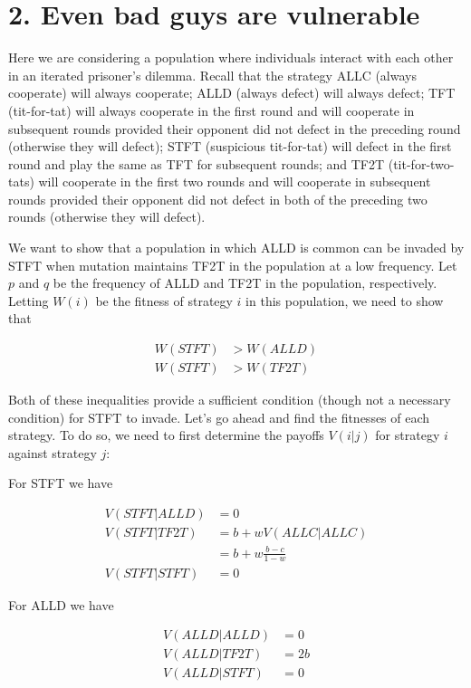 \documentclass{article}
\begin{document}
\section*{2. Even bad guys are vulnerable}

Here we are considering a population where individuals interact with
each other in an iterated prisoner's dilemma. Recall that the strategy
ALLC (always cooperate) will always cooperate; ALLD (always defect) will
always defect; TFT (tit-for-tat) will always cooperate in the first
round and will cooperate in subsequent rounds provided their opponent
did not defect in the preceding round (otherwise they will defect); STFT
(suspicious tit-for-tat) will defect in the first round and play the
same as TFT for subsequent rounds; and TF2T (tit-for-two-tats) will
cooperate in the first two rounds and will cooperate in subsequent
rounds provided their opponent did not defect in both of the preceding
two rounds (otherwise they will defect).

We want to show that a population in which ALLD is common can be invaded
by STFT when mutation maintains TF2T in the population at a low
frequency. Let $p$ and $q$ be the frequency of ALLD and TF2T in the
population, respectively. Letting $W(i)$ be the fitness of strategy $i$
in this population, we need to show that

\begin{align*}
    W(STFT) &> W(ALLD) \\
    W(STFT) &> W(TF2T)
\end{align*}

Both of these inequalities provide a sufficient condition (though not a
necessary condition) for STFT to invade. Let's go ahead and find the
fitnesses of each strategy. To do so, we need to first determine the
payoffs $V(i|j)$ for strategy $i$ against strategy $j$:

For STFT we have

\begin{align*}
    V(STFT|ALLD) &= 0 \\
    V(STFT|TF2T) &= b + w V(ALLC|ALLC) \\
                 &= b + w \frac{b - c}{1 - w} \\
    V(STFT|STFT) &= 0
\end{align*}

For ALLD we have

\begin{align*}
    V(ALLD|ALLD) &= 0 \\
    V(ALLD|TF2T) &= 2 b \\
    V(ALLD|STFT) &= 0
\end{align*}
\end{document}
